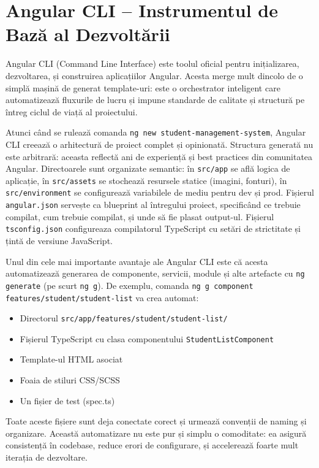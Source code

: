 \section{Angular CLI – Instrumentul de Bază al Dezvoltării}

Angular CLI (Command Line Interface) este toolul oficial pentru inițializarea, dezvoltarea, și construirea aplicațiilor Angular. Acesta merge mult dincolo de o simplă mașină de generat template-uri: este o orchestrator inteligent care automatizează fluxurile de lucru și impune standarde de calitate și structură pe întreg ciclul de viață al proiectului.

Atunci când se rulează comanda \texttt{ng new student-management-system}, Angular CLI creează o arhitectură de proiect complet și opinionată. Structura generată nu este arbitrară: aceasta reflectă ani de experiență și best practices din comunitatea Angular. Directoarele sunt organizate semantic: în \texttt{src/app} se află logica de aplicație, în \texttt{src/assets} se stochează resursele statice (imagini, fonturi), în \texttt{src/environment} se configurează variabilele de mediu pentru dev și prod. Fișierul \texttt{angular.json} servește ca blueprint al întregului proiect, specificând ce trebuie compilat, cum trebuie compilat, și unde să fie plasat output-ul. Fișierul \texttt{tsconfig.json} configureaza compilatorul TypeScript cu setări de strictitate și țintă de versiune JavaScript.

Unul din cele mai importante avantaje ale Angular CLI este că acesta automatizează generarea de componente, servicii, module și alte artefacte cu \texttt{ng generate} (pe scurt \texttt{ng g}). De exemplu, comanda \texttt{ng g component features/student/student-list} va crea automat:
\begin{itemize}
  \item Directorul \texttt{src/app/features/student/student-list/}
  \item Fișierul TypeScript cu clasa componentului \texttt{StudentListComponent}
  \item Template-ul HTML asociat
  \item Foaia de stiluri CSS/SCSS
  \item Un fișier de test (spec.ts)
\end{itemize}

Toate aceste fișiere sunt deja conectate corect și urmează convenții de naming și organizare. Această automatizare nu este pur și simplu o comoditate: ea asigură consistență în codebase, reduce erori de configurare, și accelerează foarte mult iterația de dezvoltare.

